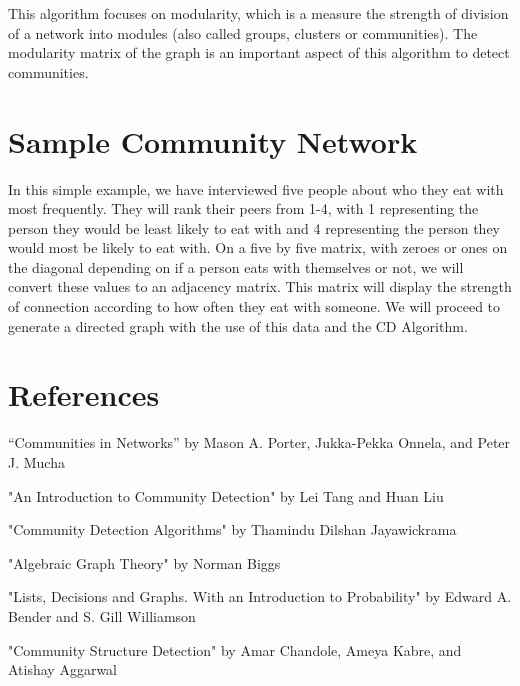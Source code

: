 \documentclass{article}
\begin{document}
\bigskip 

\noindent This algorithm focuses on modularity, which is a measure the strength of division of a network into modules (also called groups, clusters or communities). The modularity matrix of the graph is an important aspect of this algorithm to detect communities. 


\section{Sample Community Network}
In this simple example, we have interviewed five people about who they eat with most frequently. 
They will rank their peers from 1-4, with 1 representing the person they would be least likely to eat with and 4 representing the person they would most be likely to eat with. 
On a five by five matrix, with zeroes or ones on the diagonal depending on if a person eats with themselves or not, we will convert these values to an adjacency matrix.
This matrix will display the strength of connection according to how often they eat with someone.
We will proceed to generate a directed graph with the use of this data and the CD Algorithm.

\pagebreak
\section*{References}

\bigskip

\noindent “Communities in Networks” by Mason A. Porter, Jukka-Pekka Onnela, and Peter J. Mucha

\bigskip 

\noindent "An Introduction to Community Detection" by Lei Tang and Huan Liu

\bigskip 

\noindent "Community Detection Algorithms" by Thamindu Dilshan Jayawickrama

\bigskip 

\noindent "Algebraic Graph Theory" by Norman Biggs

\bigskip 

\noindent "Lists, Decisions and Graphs. With an Introduction to Probability" by Edward A. Bender and S. Gill Williamson

\bigskip 

\noindent "Community Structure Detection" by Amar Chandole, Ameya Kabre, and \linebreak Atishay Aggarwal

\bigskip
\end{document}
